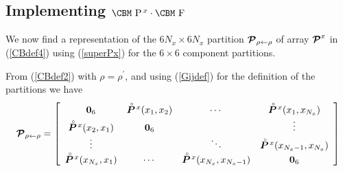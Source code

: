 \subsection{ Implementing $\mbox{\CBM  P}\,{}^{x}\cdot\mbox{\CBM  F}$}

We now find a representation of the $6 N_x \times 6 N_x$ partition  ${\CB P}_{\rho \leftarrow 
\rho}$ of array ${\CB P}^{x}$ in (\ref{CBdef4}) using (\ref{superPx}) for the 
$6 \times 6$ component partitions. 

From (\ref{CBdef2}) with $\rho=\rho^{\prime}$, 
and using (\ref{Gijdef}) for the definition of the  partitions we have
\begin{eqnarray} \label{CBdef5}
{\CB P}_{\rho \leftarrow   \rho}=
\left[{\begin{array}{cccc}
{\bf 0}_{6}&\rf{\bmi P}\!{}^{x}({x_1},{x_2})&\cdots 
&\rf{\bmi P}\!{}^{x}({x_1},{x_{N_x}})\\
\rf{\bmi P}\!{}^{x}({x_2},{x_1})&{\bf 0}_{6}&&\vdots\\
\vdots&&\ddots&\rf{\bmi P}\!{}^{x}(x_{N_x-1} , {x_{N_x}})\\
\rf{\bmi P}\!{}^{x}(x_{N_x},x_1)&\cdots &
\rf{\bmi P}\!{}^{x}(x_{N_x},x_{N_x-1})&{\bf 0}_{6}
\end{array}}\right]
\end{eqnarray}


